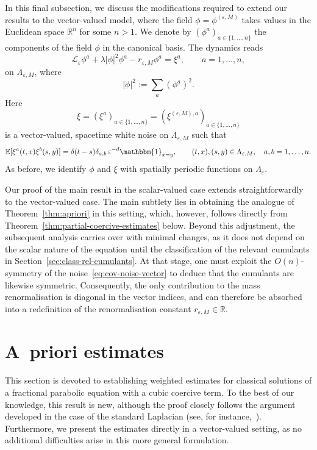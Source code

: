 \documentclass{article}
\numberwithin{equation}{section}
\newcommand{\assign}{:=}
\theoremstyle{plain}
\theoremstyle{definition}
\begin{document}
In this final subsection, we discuss the modifications required to extend our
results to the vector-valued model, where the field $\phi =
\phi^{(\varepsilon, M)}$ takes values in the Euclidean space $\mathbb{R}^n$
for some $n > 1$. We denote by $(\phi^a)_{a \in \{ 1, \ldots, n \}}$ the
components of the field $\phi$ in the canonical basis. The dynamics reads
\begin{equation}
  \mathcal{L}_{\varepsilon} \phi^a + \lambda | \phi  |^2 {\phi^a}  - r_{\varepsilon,M}  \phi^a
  = \xi^a, \qquad a = 1, \ldots, n, \label{eq:dynamics-eps-vector}
\end{equation}
on $\Lambda_{\varepsilon, M}$, where
\[ | \phi |^2  \assign \sum_a (\phi^a)^2 . \]
Here
\begin{equation}\label{eq:cov-noise-vector}
	\xi = (\xi^a)_{a \in \{ 1, \ldots, n \}} = (\xi^{(\varepsilon, M), a})_{a
		\in \{ 1, \ldots, n \}}
\end{equation}
is a vector-valued, spacetime white noise on $\Lambda_{\varepsilon, M}$ such
that
\[
  \mathbb{E} [\xi^a (t, x) \xi^b (s, y)] = \delta (t - s) \delta_{a, b}
  \,\varepsilon^{-d}\mathbbm{1}_{x = y}, \qquad (t, x), (s, y) \in \Lambda_{\varepsilon, M},
  \quad a, b = 1, \ldots, n.
\]
As before, we identify $\phi$ and $\xi$ with spatially
periodic functions on $\Lambda_{\varepsilon}$.

Our proof of the main result in the scalar-valued case extends
straightforwardly to the vector-valued case. The main subtlety lies in
obtaining the analogue of Theorem~\ref{thm:apriori} in this setting, which,
however, follows directly from Theorem~\ref{thm:partial-coercive-estimates}
below. Beyond this adjustment, the subsequent analysis carries over with
minimal changes, as it does not depend on the scalar nature of the equation
until the classification of the relevant cumulants in
Section~\ref{sec:class-rel-cumulants}. At that stage, one must exploit the
$O (n)$-symmetry of the noise~\eqref{eq:cov-noise-vector} to deduce that the
cumulants are likewise symmetric. Consequently, the only contribution to the
mass renormalisation is diagonal in the vector indices, and can therefore be
absorbed into a redefinition of the renormalisation constant $r_{\varepsilon, M} \in \mathbb{R}$.

\section{A~priori estimates}\label{sec:apriori}

This section is devoted to establishing weighted estimates for classical
solutions of a fractional parabolic equation with a cubic coercive term. To
the best of our knowledge, this result is new, although the proof closely
follows the argument developed in the case of the standard Laplacian (see, for
instance,~{\cite{gubinelliGlobalSolutionsElliptic2019}}). Furthermore, we
present the estimates directly in a vector-valued setting, as no additional
difficulties arise in this more general formulation.
\end{document}
